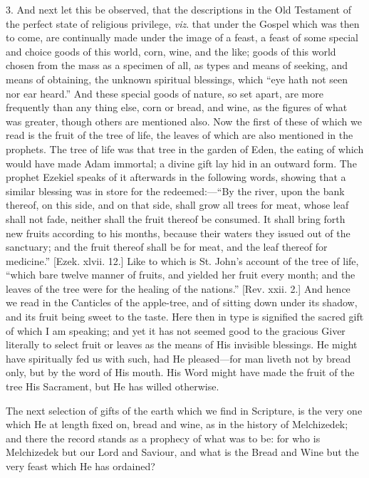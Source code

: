 3. And next let this be observed, that the descriptions in the Old
Testament of the perfect state of religious privilege, \emph{viz}. that under
the Gospel which was then to come, are continually made under the
image of a feast, a feast of some special and choice goods of this
world, corn, wine, and the like; goods of this world chosen from the
mass as a specimen of all, as types and means of seeking, and means of
obtaining, the unknown spiritual blessings, which ``eye hath not
seen nor ear heard.'' And these special goods of nature, so set
apart, are more frequently than any thing else, corn or bread, and
wine, as the figures of what was greater, though others are mentioned
also. Now the first of these of which we read is the fruit of the tree
of life, the leaves of which are also mentioned in the prophets. The
tree of life was that tree in the garden of Eden, the eating of which
would have made Adam immortal; a divine gift lay hid in an outward
form. The prophet Ezekiel speaks of it afterwards in the following
words, showing that a similar blessing was in store for the redeemed:—``By
the river, upon the bank thereof, on this side, and on that side,
shall grow all trees for meat, whose leaf shall not fade, neither
shall the fruit thereof be consumed. It shall bring forth new fruits
according to his months, because their waters they issued out of the
sanctuary; and the fruit thereof shall be for meat, and the leaf
thereof for medicine.'' [Ezek. xlvii. 12.] Like to which is St.
John's account of the tree of life, ``which bare twelve manner of
fruits, and yielded her fruit every month; and the leaves of the tree
were for the healing of the nations.'' [Rev. xxii. 2.] And hence
we read in the Canticles of the apple-tree, and of sitting down under
its shadow, and its fruit being sweet to the taste. Here then in type
is signified the sacred gift of which I am speaking; and yet it has
not seemed good to the gracious Giver literally to select fruit or
leaves as the means of His invisible blessings. He might have
spiritually fed us with such, had He pleased—for man liveth not by
bread only, but by the word of His mouth. His Word might have made the
fruit of the tree His Sacrament, but He has willed otherwise.

The next selection of gifts of the earth which we find in
Scripture, is the very one which He at length fixed on, bread and
wine, as in the history of Melchizedek; and there the record stands as
a prophecy of what was to be: for who is Melchizedek but our Lord and
Saviour, and what is the Bread and Wine but the very feast which He
has ordained?

